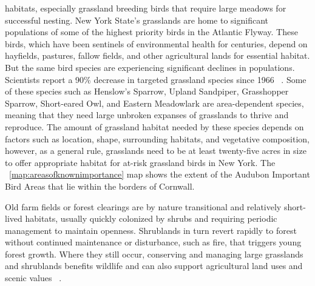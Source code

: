 habitats, especially grassland breeding birds that require large meadows for
successful nesting. New York State's grasslands are home to significant
populations of some of the highest priority birds in the Atlantic Flyway. These
birds, which have been sentinels of environmental health for centuries, depend
on hayfields, pastures, fallow fields, and other agricultural lands for
essential habitat. But the same bird species are experiencing significant
declines in populations. Scientists report a 90\% decrease in targeted
grassland species since 1966 ~\citep{audoboniba}. Some of these species such as Henslow's
Sparrow, Upland Sandpiper, Grasshopper Sparrow, Short-eared Owl, and Eastern
Meadowlark are area-dependent species, meaning that they need large unbroken
expanses of grasslands to thrive and reproduce. The amount of grassland habitat
needed by these species depends on factors such as location, shape, surrounding
habitats, and vegetative composition, however, as a general rule, grasslands
need to be at least twenty-five acres in size to offer appropriate habitat for
at-risk grassland birds in New York. The ~\ref{map:areasofknownimportance}
map shows the extent of the Audubon Important Bird Areas that lie within the
borders of Cornwall.
\par
Old farm fields or forest clearings are by nature transitional and relatively
short-lived habitats, usually quickly colonized by shrubs and requiring
periodic management to maintain openness. Shrublands in turn revert rapidly to
forest without continued maintenance or disturbance, such as fire, that
triggers young forest growth. Where they still occur, conserving and managing
large grasslands and shrublands benefits wildlife and can also support
agricultural land uses and scenic values ~\citep{haeckel2014}.
